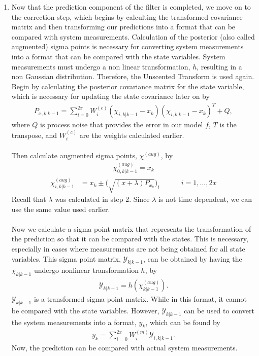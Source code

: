 \begin{enumerate}
        
                \item Now that the prediction component of the filter is completed, we move on to the correction step, which begins by calculting the transformed covariance matrix and then transforming our predictions into a format that can be compared with system measurements. Calculation of the posterior (also called augmented) sigma points is necessary for converting system measurements into a format that can be compared with the state variables. System measurements must undergo a non linear transformation, $h$, resulting in a non Gaussian distribution. Therefore, the Unscented Transform is used again.
                Begin by calculating the posterior covariance matrix for the state variable, which is necessary for updating the state covariance later on by
        \begin{align*}
        P_{x, k | k-1} = \sum^{2x}_{i = 0} W_i^{(c)} (\chi_{i, k | k - 1} -   x_{k} )(\chi_{i, k | k - 1} - x_{k} )^T + Q,
        \end{align*} 
        where $Q$ is process noise that provides the error in our model $f$, $T$ is the transpose, and $W_i^{(c)}$ are the weights calculated earlier. \\ \\        
                
\noindent Then calculate augmented sigma points, $\chi^{(aug)}$, by
      \begin{align*}
        \chi^{(aug)}_{0, k|k-1} =  x_{k}
        \end{align*}
         \begin{align*}
        \chi^{(aug)}_{ i,k |k-1} &= x_k  \pm \bigg(\sqrt{(x+\lambda)P_{x_k}} \bigg)_{i} \quad \quad \quad  i=1,\dots,2x
        \end{align*}
        Recall that $\lambda$ was calculated in step 2. Since $\lambda$ is not time dependent, we can use the same value used earlier. \\ \\
        Now we calculate a sigma point matrix that represents the transformation of the prediction so that it can be compared with the states. This is necessary, especially in cases where measurements are not being obtained for all state variables. This sigma point matrix, $\mathcal{Y}_{k|k-1}$, can be obtained by having the $\chi_{k|k-1}$ undergo nonlinear transformation $h$, by
         \begin{align*}
       \mathcal{Y}_{k|k-1} = h(\chi^{(aug)}_{k|k-1}).
       \end{align*}
       $\mathcal{Y}_{k|k-1} $ is a transformed sigma point matrix. While in this format, it cannot be compared with the state variables. However, $\mathcal{Y}_{k|k-1}$ can be used to convert the system measurements into a format, $y_{k} $, which can be found by 
       \begin{align*}
       y_{k} = \sum^{2x}_{i = 0} W_i^{(m)}  \mathcal{Y}_{i, k | k - 1}.
       \end{align*}
       Now, the prediction can be compared with actual system measurements.
       

\end{enumerate}
